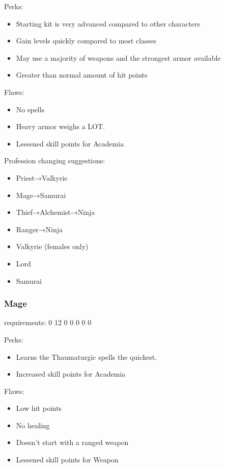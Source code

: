 \documentclass[12pt]{article}
\newcommand{\WviiTwoColumnSetup}{\raggedcolumns\RaggedRight}
\begin{document}
\begin{multicols}{2}\WviiTwoColumnSetup
Perks:

\begin{itemize}
\item
  Starting kit is very advanced compared to other characters
\item
  Gain levels quickly compared to most classes
\item
  May use a majority of weapons and the strongest armor available
\item
  Greater than normal amount of hit points
\end{itemize}
\columnbreak

Flaws:

\begin{itemize}
\item
  No spells
\item
  Heavy armor weighs a LOT.
\item
  Lessened skill points for Academia
\end{itemize}
\end{multicols}

Profession changing suggestions:

\begin{itemize}
\item
  Priest→Valkyrie
\item
  Mage→Samurai
\item
  Thief→Alchemist→Ninja
\item
  Ranger→Ninja
\item
  Valkyrie (females only)
\item
  Lord
\item
  Samurai
\end{itemize}

\subsubsection{Mage}\label{mage}

requirements: 0 12 0 0 0 0 0

\begin{multicols}{2}\WviiTwoColumnSetup
Perks:

\begin{itemize}
\item
  Learns the Thaumaturgic spells the quickest.
\item
  Increased skill points for Academia
\end{itemize}
\columnbreak

Flaws:

\begin{itemize}
\item
  Low hit points
\item
  No healing
\item
  Doesn't start with a ranged weapon
\item
  Lessened skill points for Weapon
\end{itemize}
\end{multicols}
\end{document}
